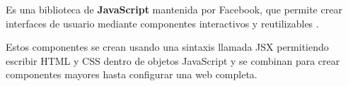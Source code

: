 \documentclass[12pt,twoside,titlepage]{report}
\begin{document}
Es una biblioteca de \textbf{JavaScript} mantenida por Facebook, que permite crear interfaces de usuario mediante componentes interactivos y reutilizables \cite{react1}.

Estos componentes se crean usando una sintaxis llamada JSX permitiendo escribir HTML y CSS dentro de objetos JavaScript y se combinan para crear componentes mayores hasta configurar una web completa.

\end{document}
